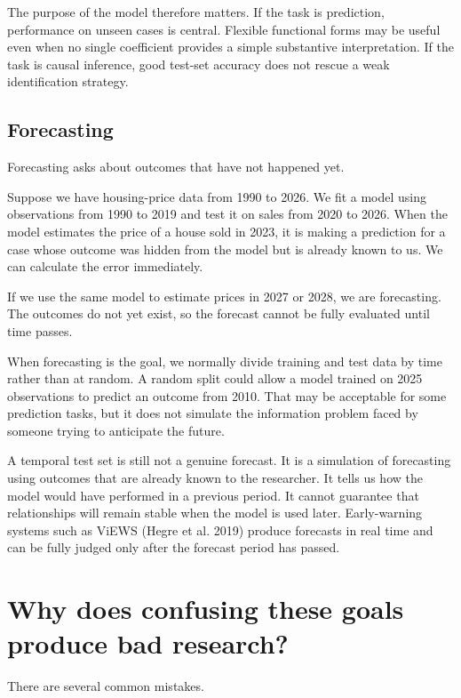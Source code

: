 \documentclass[
  a4paper,
]{scrbook}
\begin{document}
The purpose of the model therefore matters. If the task is prediction,
performance on unseen cases is central. Flexible functional forms may be
useful even when no single coefficient provides a simple substantive
interpretation. If the task is causal inference, good test-set accuracy
does not rescue a weak identification strategy.

\subsection{Forecasting}\label{forecasting}

Forecasting asks about outcomes that have not happened yet.

Suppose we have housing-price data from 1990 to 2026. We fit a model
using observations from 1990 to 2019 and test it on sales from 2020 to
2026. When the model estimates the price of a house sold in 2023, it is
making a prediction for a case whose outcome was hidden from the model
but is already known to us. We can calculate the error immediately.

If we use the same model to estimate prices in 2027 or 2028, we are
forecasting. The outcomes do not yet exist, so the forecast cannot be
fully evaluated until time passes.

When forecasting is the goal, we normally divide training and test data
by time rather than at random. A random split could allow a model
trained on 2025 observations to predict an outcome from 2010. That may
be acceptable for some prediction tasks, but it does not simulate the
information problem faced by someone trying to anticipate the future.

A temporal test set is still not a genuine forecast. It is a simulation
of forecasting using outcomes that are already known to the researcher.
It tells us how the model would have performed in a previous period. It
cannot guarantee that relationships will remain stable when the model is
used later. Early-warning systems such as ViEWS ({Hegre et al.} 2019)
produce forecasts in real time and can be fully judged only after the
forecast period has passed.

\section{Why does confusing these goals produce bad
research?}\label{why-does-confusing-these-goals-produce-bad-research}

There are several common mistakes.
\end{document}
